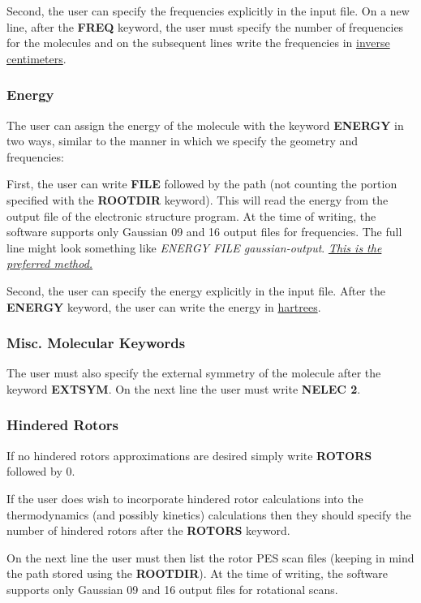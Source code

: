 \documentclass[a4paper,12pt]{article}
\begin{document}
Second, the user can specify the frequencies explicitly in the input file. On a new line, after the \textbf{FREQ} keyword, the user must specify the number of frequencies for the molecules and on the subsequent lines write the frequencies in \underline{inverse centimeters}.

\subsubsection{Energy}
The user can assign the energy of the molecule with the keyword \textbf{ENERGY} in two ways, similar to the manner in which we specify the geometry and frequencies:

First, the user can write \textbf{FILE} followed by the path (not counting the portion specified with the \textbf{ROOTDIR} keyword). This will read the energy from the output file of the electronic structure program.
At the time of writing, the software supports only Gaussian 09 and 16 output files for frequencies. The full line might look something like \textit{ENERGY FILE gaussian-output}. \underline{\textit{This is the preferred method.}}

Second, the user can specify the energy explicitly in the input file. After the \textbf{ENERGY} keyword, the user can write the energy in \underline{hartrees}.

\subsubsection{Misc. Molecular Keywords}
The user must also specify the external symmetry of the molecule after the keyword \textbf{EXTSYM}. On the next line the user must write \textbf{NELEC 2}.

\subsubsection{Hindered Rotors}
If no hindered rotors approximations are desired simply write \textbf{ROTORS} followed by 0.

If the user does wish to incorporate hindered rotor calculations into the thermodynamics (and possibly kinetics) calculations then they should specify the number of hindered rotors after the \textbf{ROTORS} keyword.

On the next line the user must then list the rotor PES scan files (keeping in mind the path stored using the \textbf{ROOTDIR}). At the time of writing, the software supports only Gaussian 09 and 16 output files for rotational scans.
\end{document}
